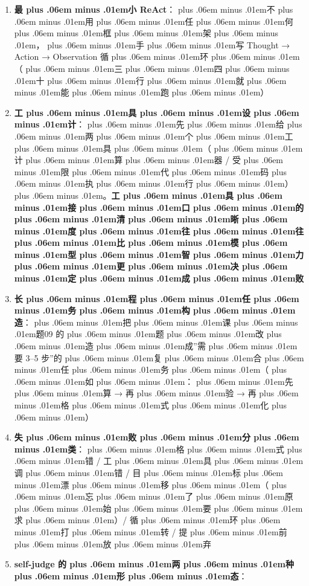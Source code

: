 \documentclass[
]{article}
\newcommand{\passthrough}[1]{#1}
\providecommand{\tightlist}{%
  \setlength{\itemsep}{0pt}\setlength{\parskip}{0pt}}
\def\zh#1{{\zhfont #1}}
\def\sym#1{{\symfont #1}}
\def\codezh#1{{\zhmonofont #1}}
\def\zhglue{\hskip0pt plus .06em minus .01em}
\begin{document}
\begin{enumerate}
\def\labelenumi{\arabic{enumi}.}
\tightlist
\item
  \textbf{\zh{最\zhglue 小} ReAct}\zh{：\zhglue 不\zhglue 用\zhglue 任\zhglue 何\zhglue 框\zhglue 架\zhglue ，\zhglue 手\zhglue 写} \passthrough{\codezh{Thought {\sym{→}} Action {\sym{→}} Observation}} \zh{循\zhglue 环\zhglue （\zhglue 三\zhglue 四\zhglue 十\zhglue 行\zhglue 就\zhglue 能\zhglue 跑\zhglue ）}
\item
  \textbf{\zh{工\zhglue 具\zhglue 设\zhglue 计}}\zh{：\zhglue 先\zhglue 给\zhglue 两\zhglue 个\zhglue 工\zhglue 具\zhglue （\zhglue 计\zhglue 算\zhglue 器} / \zh{受\zhglue 限\zhglue 代\zhglue 码\zhglue 执\zhglue 行\zhglue ）\zhglue 。}\textbf{\zh{工\zhglue 具\zhglue 接\zhglue 口\zhglue 的\zhglue 清\zhglue 晰\zhglue 度\zhglue 往\zhglue 往\zhglue 比\zhglue 模\zhglue 型\zhglue 智\zhglue 力\zhglue 更\zhglue 决\zhglue 定\zhglue 成\zhglue 败}}
\item
  \textbf{\zh{长\zhglue 程\zhglue 任\zhglue 务\zhglue 构\zhglue 造}}\zh{：\zhglue 把\zhglue 课\zhglue 题}09 \zh{的\zhglue 题\zhglue 改\zhglue 造\zhglue 成}''\zh{需\zhglue 要} 3--5 \zh{步}''\zh{的\zhglue 复\zhglue 合\zhglue 任\zhglue 务\zhglue （\zhglue 如\zhglue ：\zhglue 先\zhglue 算} \sym{→} \zh{再\zhglue 验} \sym{→} \zh{再\zhglue 格\zhglue 式\zhglue 化\zhglue ）}
\item
  \textbf{\zh{失\zhglue 败\zhglue 分\zhglue 类}}\zh{：\zhglue 格\zhglue 式\zhglue 错} / \zh{工\zhglue 具\zhglue 调\zhglue 错} / \zh{目\zhglue 标\zhglue 漂\zhglue 移\zhglue （\zhglue 忘\zhglue 了\zhglue 原\zhglue 始\zhglue 要\zhglue 求\zhglue ）}/ \zh{循\zhglue 环\zhglue 打\zhglue 转} / \zh{提\zhglue 前\zhglue 放\zhglue 弃}
\item
  \textbf{self-judge \zh{的\zhglue 两\zhglue 种\zhglue 形\zhglue 态}}\zh{：}


\end{enumerate}
\end{document}
